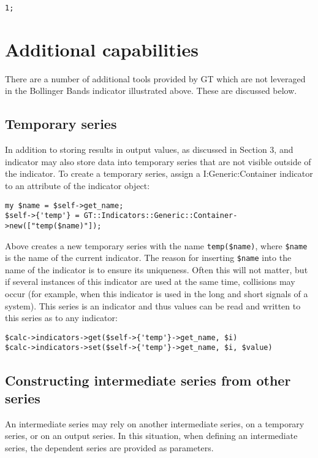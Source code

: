 \documentclass[11pt,twoside]{article}
\begin{document}
\begin{lstlisting}[name=example]
1;
\end{lstlisting}

\section{Additional capabilities}
There are a number of additional tools provided by GT which are not
leveraged in the Bollinger Bands indicator illustrated above. These are
discussed below.

\subsection[Temporary series]{\label{bkm:Ref192502379}Temporary series}
In addition to storing results in output values, as discussed in Section
3, and indicator may also store data into temporary series that are not
visible outside of the indicator. To create a temporary series, assign
a I:Generic:Container indicator to an attribute of the indicator
object:
\begin{lstlisting}[numbers=none]
my $name = $self->get_name;
$self->{'temp'} = GT::Indicators::Generic::Container->new(["temp($name)"]);
\end{lstlisting}

Above creates a new temporary series with the name
\lstinline!temp($name)!, where \lstinline!$name! is the name of the current indicator. The reason for inserting \lstinline!$name! into the name of the indicator is to ensure its uniqueness. Often this will not matter, but if several instances of this indicator are used at the same time, collisions may occur (for example, when this indicator is used in the long and short signals of a system). This series is an indicator and thus values
can be read and written to this series as to any indicator:
\begin{lstlisting}[numbers=none]
$calc->indicators->get($self->{'temp'}->get_name, $i)
$calc->indicators->set($self->{'temp'}->get_name, $i, $value)
\end{lstlisting}

\subsection[Constructing intermediate series from other
series]{\label{bkm:Ref192502529}Constructing intermediate series from
other series}
An intermediate series may rely on another intermediate series, on a
temporary series, or on an output series. In this situation, when
defining an intermediate series, the dependent series are provided as
parameters.
\end{document}

